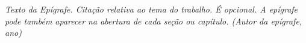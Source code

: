 \thispagestyle{empty}

\mbox{}
\vfill
\begin{flushright}
  \textit{Texto da Epígrafe. Citação relativa ao tema do trabalho. É opcional. A epígrafe pode também aparecer na abertura de cada seção ou capítulo. (Autor da epígrafe, ano)
  	}
\end{flushright}
\bigskip

\cleardoublepageempty
